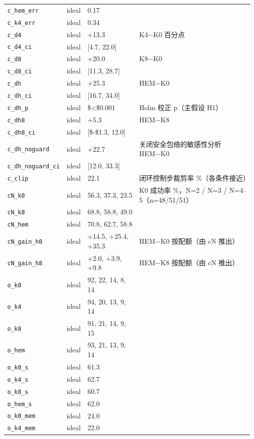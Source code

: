 \begin{longtable}{p{3.2cm}p{0.9cm}p{4.2cm}p{6.2cm}}
\texttt{c\_hem\_err} & ideal & 0.17 & \\
\texttt{c\_k4\_err} & ideal & 0.34 & \\
\texttt{c\_d4} & ideal & +13.3 & K4−K0 百分点\\
\texttt{c\_d4\_ci} & ideal & [4.7, 22.0] & \\
\texttt{c\_d8} & ideal & +20.0 & K8−K0\\
\texttt{c\_d8\_ci} & ideal & [11.3, 28.7] & \\
\texttt{c\_dh} & ideal & +25.3 & HEM−K0\\
\texttt{c\_dh\_ci} & ideal & [16.7, 34.0] & \\
\texttt{c\_dh\_p} & ideal & \$<\$0.001 & Holm 校正 p（主假设 H1）\\
\texttt{c\_dh8} & ideal & +5.3 & HEM−K8\\
\texttt{c\_dh8\_ci} & ideal & [\$-\$1.3, 12.0] & \\
\texttt{c\_dh\_noguard} & ideal & +22.7 & 关闭安全包络的敏感性分析 HEM−K0\\
\texttt{c\_dh\_noguard\_ci} & ideal & [12.0, 33.3] & \\
\texttt{c\_clip} & ideal & 22.1 & 闭环控制步裁剪率 \%（各条件接近）\\
\texttt{cN\_k0} & ideal & 56.3, 37.3, 23.5 & K0 成功率 \%，N=2 / N=3 / N=4–5（n=48/51/51）\\
\texttt{cN\_k8} & ideal & 68.8, 58.8, 49.0 & \\
\texttt{cN\_hem} & ideal & 70.8, 62.7, 58.8 & \\
\texttt{cN\_gain\_h0} & ideal & +14.5, +25.4, +35.3 & HEM−K0 按配额（由 cN 推出）\\
\texttt{cN\_gain\_h8} & ideal & +2.0, +3.9, +9.8 & HEM−K8 按配额（由 cN 推出）\\
\texttt{o\_k0} & ideal & 92, 22, 14, 8, 14 & \\
\texttt{o\_k4} & ideal & 94, 20, 13, 9, 14 & \\
\texttt{o\_k8} & ideal & 91, 21, 14, 9, 15 & \\
\texttt{o\_hem} & ideal & 93, 21, 13, 9, 14 & \\
\texttt{o\_k0\_s} & ideal & 61.3 & \\
\texttt{o\_k4\_s} & ideal & 62.7 & \\
\texttt{o\_k8\_s} & ideal & 60.7 & \\
\texttt{o\_hem\_s} & ideal & 62.0 & \\
\texttt{o\_k0\_mem} & ideal & 24.0 & \\
\texttt{o\_k4\_mem} & ideal & 22.0 & \\

\end{longtable}
